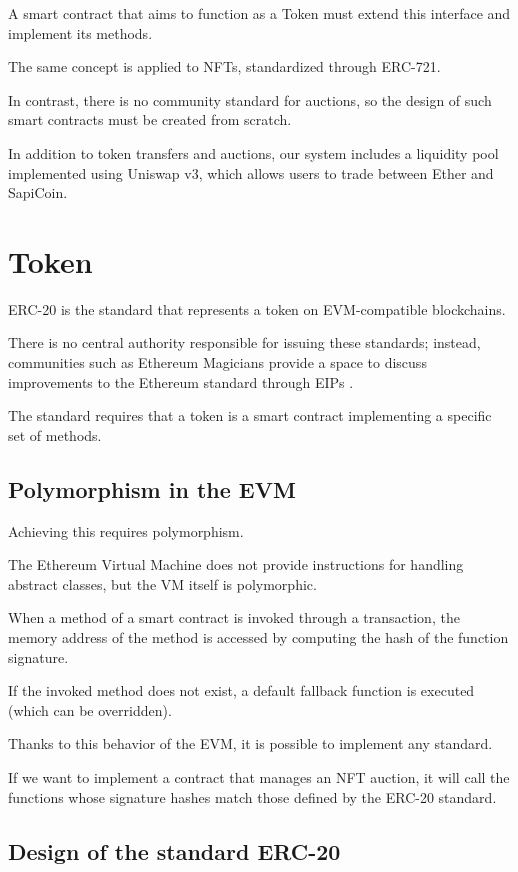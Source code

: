 \documentclass[conference]{IEEEtran}
\begin{document}
A smart contract that aims to function as a Token must extend this interface and implement its methods.

The same concept is applied to NFTs, standardized through ERC-721. \cite{erc721}

In contrast, there is no community standard for auctions, so the design of such smart contracts must be created from scratch.

In addition to token transfers and auctions, our system includes a liquidity pool implemented using Uniswap v3, which allows users to trade between Ether and SapiCoin.

\section{Token}

ERC-20 is the standard that represents a token on EVM-compatible blockchains.

There is no central authority responsible for issuing these standards; instead, communities such as Ethereum Magicians provide a space to discuss improvements to the Ethereum standard through EIPs \cite{ethereum-magicians}.

The standard requires that a token is a smart contract implementing a specific set of methods.

\subsection{Polymorphism in the EVM}

Achieving this requires polymorphism.

The Ethereum Virtual Machine does not provide instructions for handling abstract classes, but the VM itself is polymorphic.

When a method of a smart contract is invoked through a transaction, the memory address of the method is accessed by computing the hash of the function signature. %

If the invoked method does not exist, a default fallback function is executed (which can be overridden).

Thanks to this behavior of the EVM, it is possible to implement any standard.

If we want to implement a contract that manages an NFT auction, it will call the functions whose signature hashes match those defined by the ERC-20 standard.

\subsection{Design of the standard ERC-20}
\end{document}

